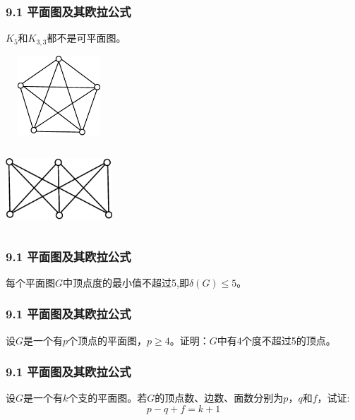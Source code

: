 \documentclass{beamer}
\begin{document}
\begin{CJK}{UTF8}{gbsn}
\begin{frame}
\end{frame}
\begin{frame}
  \frametitle{9.1 平面图及其欧拉公式}
  \begin{corollary9.1.5}
    $K_5$和$K_{3,3}$都不是可平面图。
  \end{corollary9.1.5}
\vspace{1cm}
  \begin{minipage}{0.45\linewidth}
\includegraphics[width=4cm,height=3cm]{k5}    
  \end{minipage}
  \begin{minipage}{0.45\linewidth}
    \includegraphics[width=4cm,height=3cm]{k33}
  \end{minipage}
\end{frame}
\begin{frame}
  \frametitle{9.1 平面图及其欧拉公式}
  \begin{corollary9.1.6}
    每个平面图$G$中顶点度的最小值不超过5,即$\delta (G) \leq 5$。
  \end{corollary9.1.6}
\end{frame}
\begin{frame}
  \frametitle{9.1 平面图及其欧拉公式}
  \begin{exercise1}
    设$G$是一个有$p$个顶点的平面图，$p \geq 4$。证明：$G$中有4个度不超过5的顶点。
  \end{exercise1}
\end{frame}
\begin{frame}
  \frametitle{9.1 平面图及其欧拉公式}
  \begin{exercise2}
    设$G$是一个有$k$个支的平面图。若$G$的顶点数、边数、面数分别为$p$，$q$和$f$，试证:
    \begin{equation*}
      p - q + f = k + 1
    \end{equation*}
  \end{exercise2}
\end{frame}


\end{CJK}
\end{document}
